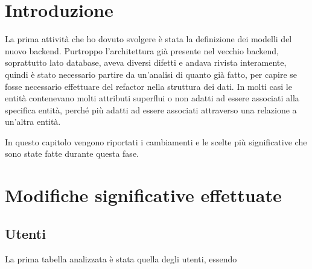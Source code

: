 \section{Introduzione}
La prima attività che ho dovuto svolgere è stata la definizione dei modelli del nuovo backend. Purtroppo l'architettura già presente nel vecchio backend, soprattutto lato database, aveva diversi difetti e andava rivista interamente, quindi è stato necessario partire da un'analisi di quanto già fatto, per capire se fosse necessario effettuare del refactor nella struttura dei dati. In molti casi le entità contenevano molti attributi superflui o non adatti ad essere associati alla specifica entità, perché più adatti ad essere associati attraverso una relazione a un'altra entità.

In questo capitolo vengono riportati i cambiamenti e le scelte più significative che sono state fatte durante questa fase.

\section{Modifiche significative effettuate}
\subsection{Utenti}
La prima tabella analizzata è stata quella degli utenti, essendo 

